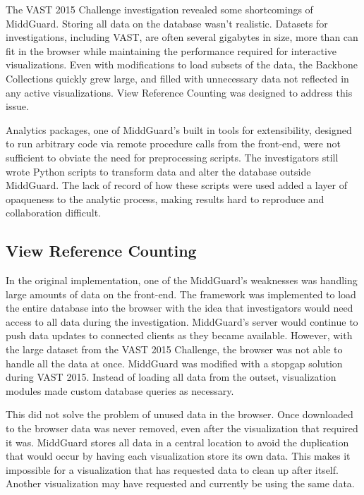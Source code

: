 \documentclass[midd]{thesis}
\begin{document}
The VAST 2015 Challenge investigation revealed some shortcomings of MiddGuard.
Storing all data on the database wasn't realistic. Datasets for investigations,
including VAST, are often several gigabytes in size, more than can fit in the
browser while maintaining the performance required for interactive
visualizations. Even with modifications to load subsets of the data, the
Backbone Collections quickly grew large, and filled with unnecessary data not
reflected in any active visualizations. View Reference Counting was designed to
address this issue.

Analytics packages, one of MiddGuard's built in tools for extensibility,
designed to run arbitrary code via remote procedure calls from the front-end,
were not sufficient to obviate the need for preprocessing scripts. The
investigators still wrote Python scripts to transform data and alter the
database outside MiddGuard. The lack of record of how these scripts were used
added a layer of opaqueness to the analytic process, making results hard to
reproduce and collaboration difficult.

\subsection{View Reference Counting}

In the original implementation, one of the MiddGuard's weaknesses was handling
large amounts of data on the front-end. The framework was implemented to load
the entire database into the browser with the idea that investigators would need
access to all data during the investigation. MiddGuard's server would continue
to push data updates to connected clients as they became available. However,
with the large dataset from the VAST 2015 Challenge, the browser was not able to
handle all the data at once. MiddGuard was modified with a stopgap solution
during VAST 2015. Instead of loading all data from the outset, visualization
modules made custom database queries as necessary.

This did not solve the problem of unused data in the browser. Once downloaded to
the browser data was never removed, even after the visualization that required
it was. MiddGuard stores all data in a central location to avoid the duplication
that would occur by having each visualization store its own data. This makes it
impossible for a visualization that has requested data to clean up after itself.
Another visualization may have requested and currently be using the same data.
\end{document}
